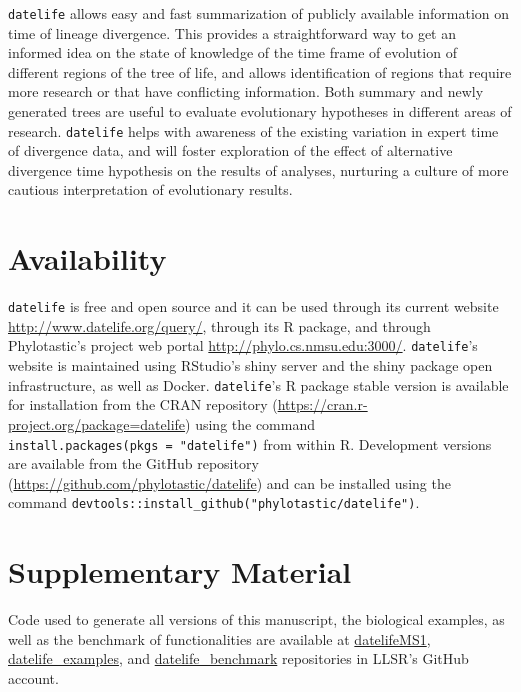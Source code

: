 \documentclass[
  english,
  man]{apa6}
\begin{document}
\texttt{datelife} allows easy and fast summarization of publicly available information
on time of lineage divergence. This provides a straightforward way to get an informed idea on the state of knowledge of the time frame of evolution of different regions of the tree of life, and allows identification of regions that require more research or that have conflicting information.
Both summary and newly generated trees are useful to evaluate evolutionary hypotheses in different areas of research. \texttt{datelife} helps with awareness of the existing variation in expert time of divergence data, and will foster exploration of the effect of alternative divergence time hypothesis on the results of analyses, nurturing a culture of more cautious interpretation of evolutionary results.

\hypertarget{availability}{%
\section{Availability}\label{availability}}

\texttt{datelife} is free and open source and it can be used through its current website
\url{http://www.datelife.org/query/}, through its R package, and through Phylotastic's project web portal \url{http://phylo.cs.nmsu.edu:3000/}.
\texttt{datelife}'s website is maintained using RStudio's shiny server and the shiny package open infrastructure, as well as Docker.
\texttt{datelife}'s R package stable version is available
for installation from the CRAN repository (\url{https://cran.r-project.org/package=datelife})
using the command \texttt{install.packages(pkgs\ =\ "datelife")} from within R. Development versions
are available from the GitHub repository (\url{https://github.com/phylotastic/datelife})
and can be installed using the command \texttt{devtools::install\_github("phylotastic/datelife")}.

\hypertarget{supplementary-material}{%
\section{Supplementary Material}\label{supplementary-material}}

Code used to generate all versions of this manuscript, the biological examples, as well as the benchmark of functionalities are available at \href{https://github.com/LunaSare/datelifeMS1}{datelifeMS1}, \href{https://github.com/LunaSare/datelife_examples}{datelife\_examples}, and \href{https://github.com/LunaSare/datelife_benchmark}{datelife\_benchmark} repositories in LLSR's GitHub account.
\end{document}

